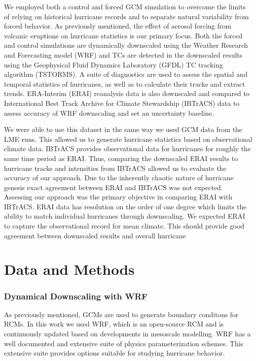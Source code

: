 
We employed both a control and forced GCM simulation to overcome the
limits of relying on historical hurricane records and to separate
natural variability from forced behavior. As previously mentioned, the
effect of aerosol forcing from volcanic eruptions on hurricane
statistics is our primary focus. Both the forced and control
simulations are dynamically downscaled using the Weather Research and
Forecasting model (WRF) \cite{wrf_tech} and TCs are detected in the
downscaled results using the Geophysical Fluid Dynamics Laboratory
(GFDL) TC tracking algorithm (TSTORMS). A suite of diagnostics are
used to assess the spatial and temporal statistics of hurricanes, as
well as to calculate their tracks and extract trends. ERA-Interim
(ERAI) reanalysis data is also downscaled and compared to
International Best Track Archive for Climate Stewardship (IBTrACS)
data to assess accuracy of WRF downscaling and set an uncertainty
baseline.


We were able to use this dataset in the same way we used GCM data from
the LME runs. This allowed us to generate hurricane statistics based
on observational climate data. IBTrACS provides observational data for
hurricanes for roughly the same time period as ERAI. Thus, comparing
the downscaled ERAI results to hurricane tracks and intensities from
IBTrACS allowed us to evaluate the accuracy of our approach. Due to
the inherently chaotic nature of hurricane genesis exact agreement
between ERAI and IBTrACS was not expected. Assessing our approach was
the primary objective in comparing ERAI with IBTrACS. ERAI data has
resolution on the order of one degree which limits the ability to
match individual hurricanes through downscaling. We expected ERAI to
capture the observational record for mean climate. This should provide
good agreement between downscaled results and overall hurricane


\section{Data and Methods}
\label{methods}

\subsubsection{Dynamical Downscaling with WRF}
\label{WRF}

As previously mentioned, GCMs are used to generate boundary conditons
for RCMs. In this work we used WRF, which is an open-source RCM and is
continuously updated based on developments in mesoscale modelling. WRF
has a well documented and extensive suite of physics parameterization
schemes. This extensive suite provides options suitable for studying
hurricane behavior.


